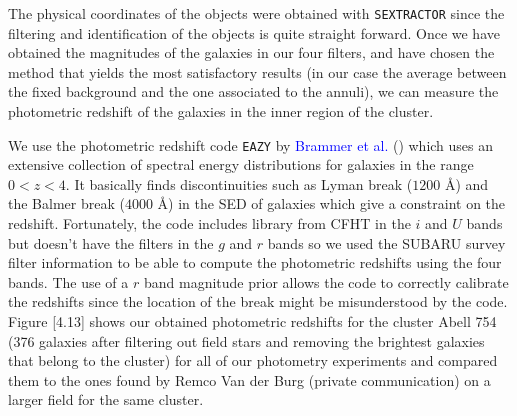 The physical coordinates of the objects  were obtained with \texttt{SEXTRACTOR} since the filtering and identification of the objects is quite straight forward. Once we have obtained the magnitudes of the galaxies in our four filters, and have chosen the method that yields the most satisfactory results (in our case the average between the fixed background and the one associated to the annuli), we can measure the photometric redshift of the galaxies in the inner region of the cluster.

We use the photometric redshift code \texttt{EAZY}  by \textcolor{blue}{Brammer et al.} (\citeyear{Reference22}) which uses an extensive collection of spectral energy distributions for galaxies in the range $0<z<4$. It basically finds discontinuities such as Lyman break ($1200$ \AA) and the Balmer break ($4000$ \AA) in the SED of galaxies which give a constraint on the redshift. Fortunately, the code includes library from CFHT in the $i$ and $U$ bands but doesn't have the filters in the $g$ and $r$ bands so we used the SUBARU survey filter information to be able to compute the photometric redshifts using the four bands. The use of a $r$ band magnitude prior allows the code to correctly calibrate the redshifts since the location of the break might be misunderstood by the code. Figure [4.13] shows our obtained photometric redshifts for the cluster Abell 754 (376 galaxies after filtering out field stars and removing the brightest galaxies that belong to the cluster) for all of our photometry experiments and compared them to the ones found by Remco Van der Burg (private communication) on a larger field for the same cluster. 

